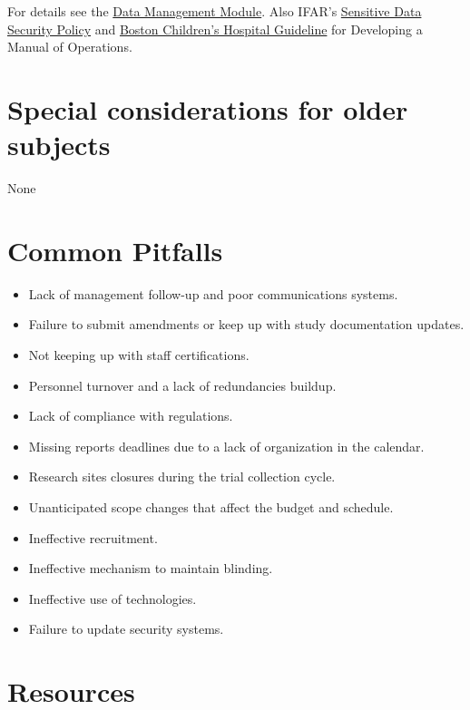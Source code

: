 \documentclass[]{book}
\providecommand{\tightlist}{%
  \setlength{\itemsep}{0pt}\setlength{\parskip}{0pt}}
\theoremstyle{definition}
\theoremstyle{definition}
\theoremstyle{definition}
\theoremstyle{remark}
\begin{document}
For details see the
\href{https://ifar-isac.github.io/book/data-management.html}{Data
Management Module}. Also IFAR's
\href{http://thehslhub/~/media/HSLNet/P_P/IFAR/IFARPPSensitiveDataSecurity.ashx}{Sensitive
Data Security Policy} and
\href{http://www.childrenshospital.org/~/media/research-and-innovation/clinical-research-center/rpg_03_final-12115/rpg052014.ashx?la=en}{Boston
Children's Hospital Guideline} for Developing a Manual of Operations.

\section{Special considerations for older
subjects}\label{special-considerations-for-older-subjects-12}

None

\section{Common Pitfalls}\label{common-pitfalls-15}

\begin{itemize}
\tightlist
\item
  Lack of management follow-up and poor communications systems.
\item
  Failure to submit amendments or keep up with study documentation
  updates.
\item
  Not keeping up with staff certifications.
\item
  Personnel turnover and a lack of redundancies buildup.
\item
  Lack of compliance with regulations.
\item
  Missing reports deadlines due to a lack of organization in the
  calendar.
\item
  Research sites closures during the trial collection cycle.
\item
  Unanticipated scope changes that affect the budget and schedule.
\item
  Ineffective recruitment.
\item
  Ineffective mechanism to maintain blinding.
\item
  Ineffective use of technologies.
\item
  Failure to update security systems.
\end{itemize}

\section{Resources}\label{resources-17}
\end{document}
